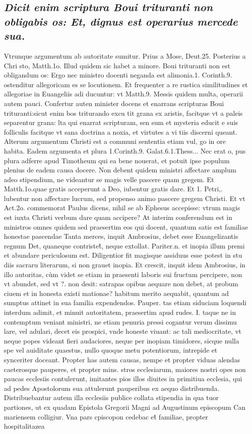 \documentclass{article}
\begin{document}
\begin{pages}
\subsection*{\textit{Dicit enim scriptura Boui trituranti non obligabis os: Et, dignus est operarius mercede sua. }}\pstart Vtrunque argumentum ab autoritate sumitur. Prius a Mose, Deut.25. Posterius a Chri sto, Matth.1o. Illud quidem sic habet a minore. Boui trituranti non est obligandum os: Ergo nec ministro docenti neganda est alimonia.1. Corinth.9. ostenditur allegoricam es se locutionem. Et frequenter a re rustica similitudines et allegoriae in Euangeliis adi ducuntur: vt Matth.9. Messis quidem multa, operarii autem pauci. Confertur auten minister docens et enarrans scripturas Boui trituranti:sicut enim bos triturando excu tit grana ex aristis, facitque vt a paleis separentur grana: lta qui enarrat scripturam, sen sum et mysteria educit e suis folliculis facitque vt sana doctrina a noxia, et virtutes a vi tiis discerni queant. Alterum argumentum Christi est a communi sententia etiam vul, go in ore habita. Eadem argumenta et plura 1.Corinth.9. Galat.6.1.Thess... Nec erat o, pus plura adferre apud Timotheum qui ea bene nouerat, et potuit ipse populum plenius de eadem causa docere. Non debent quidem ministri affectare amplum adeo stipendium, ne videantur se magis velle pascere quam gregem. Et Matth.1o.quae gratis acceperunt a Deo, iubentur gratis dare. Et 1. Petri,. lubentur non affectare lucrum, sed propenso animo pascere gregem Christi. Et vt Act.2o. commemorat Paulus dicens, nihil se ab Ephesus accepisse: vtrum magis est iuxta Christi verbum dare quam accipere? At interim conferendum est in ministros omnes quidem sed praesertim eos qui docent, quantum satis est familiae honestae pascendae Tanta merces, inquit Ambrosius, debet esse Euangelizantis regnum Det, quaneque contristet̃, neque extollat. Pariter.n. et inopia illum premi et abundare periculosum est. Diligentior fit magisque assiduus esse potest in stu diis sacraru literarum, si non grauet inopia. Et crescit, inquit idem Ambrosius, in illo autoritas, cùm videt se etiam in praesenti laboris sui fructum percipere, non vt abundet, sed vt ?.  non desit: satrapas opibus aequare non debet, at probum ciuem et in honesta existi mationae? habitum merito aequabit, quantum ad sumptus attinet in sua familia expendendos. Pauper. tas etiam siduciam loquendi interdum adimit, et minuit autoritatem, praesertim apud rudes. I. taque ne in contemptum veniant ministri, ne etiam penuria pressi cogantur verum dissimu lare, vel adulari, decet eis prospici, vnde honeste viuant: ac tali mediocritate, vt neque popes videant fieri audaciores, neque per inopiam timidores, sicque nulla spe vel auiditate quaestus, nullo quoque metu potentiorum, intrepide et synceriter doceant. Propter has autem causas, nempe et propter viduas alendas caeterosque pauperes, et propter mins. stros ecclesiarum, maiores nostri opes non paucas ecclesiis contulerunt, imitantes pios illos diuites in primitiua ecclesia, qui ad pedes Apostolorum sua attulerunt pauperibus ex aequo distribuenda. Distribuebantur autem illa ecclesiis publice collata stipendia in qua tuor partiones, ut ex quadam Epistola Gregorii Magni ad Augustinum episcopum Can mariensem colligiur. Vna pars cpiscopon cedebac et̃ familiae, propter hospitalitazea  \pend

\end{pages}
\end{document}
